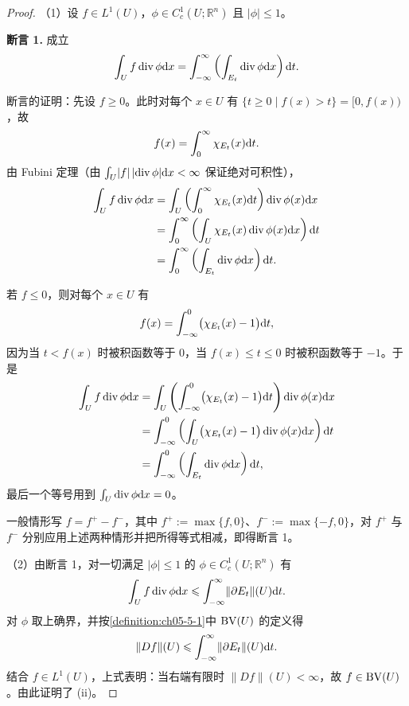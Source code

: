 \documentclass[../../main.tex]{subfiles}%
\begin{document}
\begin{proof}
（1）设 $f\in L^1(U)$，$\phi\in C_c^1(U;\mathbb{R}^n)$ 且 $\lvert\phi\rvert\leqslant1$。

\textbf{断言 1.} 成立
\begin{align*}
\int_U f\operatorname{div}\phi\mathrm{d} x=\int_{-\infty}^{\infty}\left(\int_{E_t}\operatorname{div}\phi\mathrm{d} x\right)\mathrm{d} t.
\end{align*}

断言的证明：先设 $f\geqslant0$。此时对每个 $x\in U$ 有 $\{t\geqslant0\mid f(x)>t\}=[0,f(x))$，故
\begin{align*}
f(x)=\int_0^{\infty}\chi_{E_t}(x)\mathrm{d} t.
\end{align*}
由 Fubini 定理（由 $\int_U\lvert f\rvert\,\lvert\operatorname{div}\phi\rvert\mathrm{d} x<\infty$ 保证绝对可积性），
\begin{align*}
\int_U f\operatorname{div}\phi\mathrm{d} x
&=\int_U\left(\int_0^{\infty}\chi_{E_t}(x)\mathrm{d} t\right)\operatorname{div}\phi(x)\mathrm{d} x\\
&=\int_0^{\infty}\left(\int_U\chi_{E_t}(x)\operatorname{div}\phi(x)\mathrm{d} x\right)\mathrm{d} t\\
&=\int_0^{\infty}\left(\int_{E_t}\operatorname{div}\phi\mathrm{d} x\right)\mathrm{d} t.
\end{align*}

若 $f\leqslant0$，则对每个 $x\in U$ 有
\begin{align*}
f(x)=\int_{-\infty}^0\bigl(\chi_{E_t}(x)-1\bigr)\mathrm{d} t,
\end{align*}
因为当 $t<f(x)$ 时被积函数等于 $0$，当 $f(x)\leqslant t\leqslant0$ 时被积函数等于 $-1$。于是
\begin{align*}
\int_U f\operatorname{div}\phi\mathrm{d} x
&=\int_U\left(\int_{-\infty}^0\bigl(\chi_{E_t}(x)-1\bigr)\mathrm{d} t\right)\operatorname{div}\phi(x)\mathrm{d} x\\
&=\int_{-\infty}^0\left(\int_U\bigl(\chi_{E_t}(x)-1\bigr)\operatorname{div}\phi(x)\mathrm{d} x\right)\mathrm{d} t\\
&=\int_{-\infty}^0\left(\int_{E_t}\operatorname{div}\phi\mathrm{d} x\right)\mathrm{d} t,
\end{align*}
最后一个等号用到 $\int_U\operatorname{div}\phi\mathrm{d} x=0$。

一般情形写 $f=f^+-f^-$，其中 $f^+:=\max\{f,0\}$、$f^-:=\max\{-f,0\}$，对 $f^+$ 与 $f^-$ 分别应用上述两种情形并把所得等式相减，即得断言 1。

（2）由断言 1，对一切满足 $\lvert\phi\rvert\leqslant1$ 的 $\phi\in C_c^1(U;\mathbb{R}^n)$ 有
\begin{align*}
\int_U f\operatorname{div}\phi\mathrm{d} x\leqslant\int_{-\infty}^{\infty}\lVert\partial E_t\rVert(U)\mathrm{d} t.
\end{align*}
对 $\phi$ 取上确界，并按\cref{definition:ch05-5-1}中 $\mathrm{BV}(U)$ 的定义得%
\begin{align}
\lVert Df\rVert(U)\leqslant\int_{-\infty}^{\infty}\lVert\partial E_t\rVert(U)\mathrm{d} t. \label{align:ch05-5-9-估计}
\end{align}
结合 $f\in L^1(U)$，上式表明：当右端有限时 $\lVert Df\rVert(U)<\infty$，故 $f\in\mathrm{BV}(U)$。由此证明了 (ii)。


\end{proof}
\end{document}
